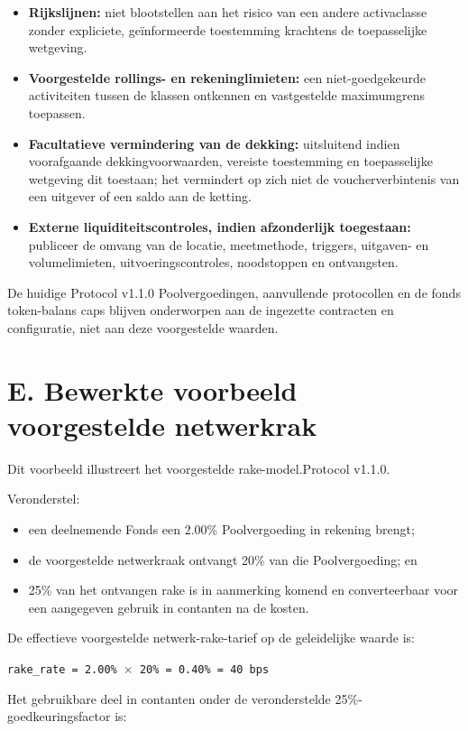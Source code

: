 \documentclass[11pt]{article}
\begin{document}
\begin{itemize}[leftmargin=*]
\item \textbf{Rijkslijnen:} niet blootstellen aan het risico van een andere activaclasse zonder expliciete, geïnformeerde toestemming krachtens de toepasselijke wetgeving.
\item \textbf{Voorgestelde rollings- en rekeninglimieten:} een niet-goedgekeurde activiteiten tussen de klassen ontkennen en vastgestelde maximumgrens toepassen.
\item \textbf{Facultatieve vermindering van de dekking:} uitsluitend indien voorafgaande dekkingvoorwaarden, vereiste toestemming en toepasselijke wetgeving dit toestaan; het vermindert op zich niet de voucherverbintenis van een uitgever of een saldo aan de ketting.
\item \textbf{Externe liquiditeitscontroles, indien afzonderlijk toegestaan:} publiceer de omvang van de locatie, meetmethode, triggers, uitgaven- en volumelimieten, uitvoeringscontroles, noodstoppen en ontvangsten.
\end{itemize}
De huidige Protocol v1.1.0 Poolvergoedingen, aanvullende protocollen en de fonds token-balans caps blijven onderworpen aan de ingezette contracten en configuratie, niet aan deze voorgestelde waarden.


\section*{E. Bewerkte voorbeeld  voorgestelde netwerkrak}

Dit voorbeeld illustreert het voorgestelde rake-model.Protocol v1.1.0.

Veronderstel:

\begin{itemize}[leftmargin=*]
\item een deelnemende Fonds een 2.00\% Poolvergoeding in rekening brengt;
\item de voorgestelde netwerkraak ontvangt 20\% van die Poolvergoeding; en
\item 25\% van het ontvangen rake is in aanmerking komend en converteerbaar voor een aangegeven gebruik in contanten na de kosten.
\end{itemize}
De effectieve voorgestelde netwerk-rake-tarief op de geleidelijke waarde is:

\texttt{rake\_rate = 2.00\% $\times$ 20\% = 0.40\% = 40 bps}

Het gebruikbare deel in contanten onder de veronderstelde 25\%-goedkeuringsfactor is:
\end{document}
